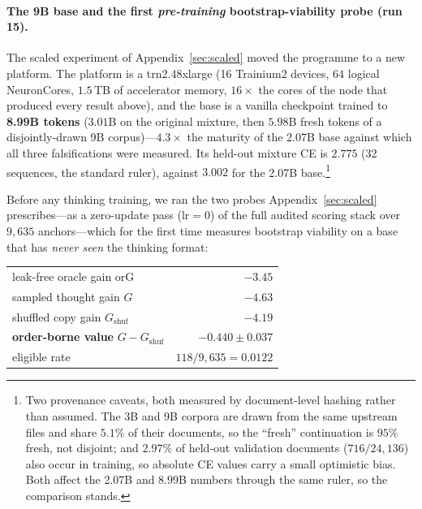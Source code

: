 \documentclass{article} %
\newcommand{\gain}{G}
\begin{document}
\paragraph{The 9B base and the first \emph{pre-training} bootstrap-viability probe (run 15).} The scaled experiment of Appendix~\ref{sec:scaled} moved the programme to a new platform. The platform is a trn2.48xlarge (16 Trainium2 devices, $64$ logical NeuronCores, $1.5$\,TB of accelerator memory, $16\times$ the cores of the node that produced every result above), and the base is a vanilla checkpoint trained to \textbf{8.99B tokens} ($3.01$B on the original mixture, then $5.98$B fresh tokens of a disjointly-drawn 9B corpus)---$4.3\times$ the maturity of the 2.07B base against which all three falsifications were measured. Its held-out mixture CE is $\mathbf{2.775}$ (32 sequences, the standard ruler), against $3.002$ for the 2.07B base.\footnote{Two provenance caveats, both measured by document-level hashing rather than assumed. The 3B and 9B corpora are drawn from the same upstream files and share $5.1\%$ of their documents, so the ``fresh'' continuation is $95\%$ fresh, not disjoint; and $2.97\%$ of held-out validation documents ($716/24{,}136$) also occur in training, so absolute CE values carry a small optimistic bias. Both affect the 2.07B and 8.99B numbers through the same ruler, so the comparison stands.}

Before any thinking training, we ran the two probes Appendix~\ref{sec:scaled} prescribes---as a zero-update pass ($\mathrm{lr}=0$) of the full audited scoring stack over $9{,}635$ anchors---which for the first time measures bootstrap viability on a base that has \emph{never seen} the thinking format:
\begin{center}\small
\begin{tabular}{lr}
\toprule
leak-free oracle gain $\mathrm{orG}$ & $-3.45$ \\
sampled thought gain $\gain$ & $-4.63$ \\
shuffled copy gain $\gain_{\mathrm{shuf}}$ & $-4.19$ \\
\textbf{order-borne value } $\gain - \gain_{\mathrm{shuf}}$ & $\mathbf{-0.440 \pm 0.037}$ \\
eligible rate & $118/9{,}635 = 0.0122$ \\
\bottomrule
\end{tabular}
\end{center}
\end{document}
